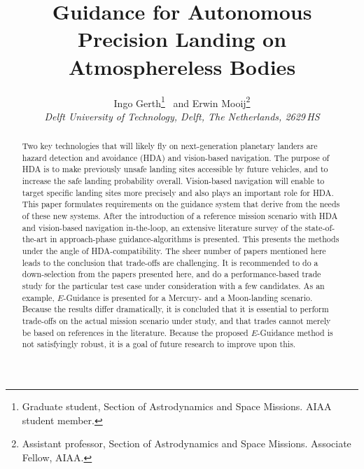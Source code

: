 \documentclass[%
]{aiaa-tc}
\title{Guidance for Autonomous Precision Landing on Atmosphereless Bodies}
\author{
 Ingo Gerth\thanks{%
     Graduate student, Section of Astrodynamics and
     Space Missions. AIAA student member.%
 }
 \ and Erwin Mooij\thanks{Assistant professor, Section of Astrodynamics and Space Missions.  Associate
     Fellow, AIAA.}\\
 {\normalsize\itshape
  Delft University of Technology, Delft, The Netherlands, 2629\,HS}
}
\begin{document}


\maketitle

\begin{abstract}
    Two key technologies that will likely fly on next-generation planetary
    landers are hazard detection and avoidance (HDA) and vision-based
    navigation. The purpose of HDA is to make previously unsafe landing sites
    accessible by future vehicles, and to increase the safe landing probability
    overall. Vision-based navigation will enable to target specific landing
    sites more precisely and also plays an important role for HDA. This paper
    formulates requirements on the guidance system that derive from the needs of
    these new systems. After the introduction of a reference mission scenario
    with HDA and vision-based navigation in-the-loop, an extensive literature
    survey of the state-of-the-art in approach-phase guidance-algorithms is
    presented. This presents the methods under the angle of HDA-compatibility.
    The sheer number of papers mentioned here leads to the conclusion that
    trade-offs are challenging. It is recommended to do a down-selection from
    the papers presented here, and do a performance-based trade study for the
    particular test case under consideration with a few candidates. As an
    example, $E$-Guidance is presented for a Mercury- and a Moon-landing
    scenario. Because the results differ dramatically, it is concluded that it
    is essential to perform trade-offs on the actual mission scenario under
    study, and that trades cannot merely be based on references in the
    literature.  Because the proposed $E$-Guidance method is not satisfyingly
    robust, it is a goal of future research to improve upon this.
\end{abstract}
\end{document}
